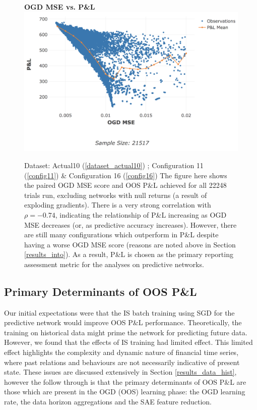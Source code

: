 \documentclass[a4paper,11pt,oneside]{article}
\theoremstyle{plain}
\theoremstyle{definition}
\begin{document}
		\begin{figure}[H]
		\textbf{OGD MSE vs. P\&L}
		\centering
		\includegraphics[scale=0.45]{images/results/intro/ogdmse_pl.png}
		\caption[OGD MSE vs. OOS P\&L]
		{Dataset: Actual10 (\ref{dataset_actual10}) ; Configuration 11 (\ref{config11}) \&  Configuration 16 (\ref{config16}) \newline 
			The figure here shows the paired OGD MSE score and OOS P\&L achieved for all 22248 trials run, excluding networks with null returns (a result of exploding gradients). There is a very strong correlation with $\rho = -0.74$, indicating the relationship of P\&L increasing as OGD MSE decreases (or, as predictive accuracy increases). However, there are still many configurations which outperform in P\&L despite having a worse OGD MSE score (reasons are noted above in Section \ref{results_into}). As a result, P\&L is chosen as the primary reporting assessment metric for the analyses on predictive networks. }
		\label{figure-ogdmse_pl}
	\end{figure}
	
	\newpage
	\subsection{Primary Determinants of OOS P\&L}\label{results_oos_pl}
	
	Our initial expectations were that the IS batch training using SGD for the predictive network would improve OOS P\&L performance. Theoretically, the training on historical data might prime the network for predicting future data. However, we found that the effects of IS training had limited effect. This limited effect highlights the complexity and dynamic nature of financial time series, where past relations and behaviours are not necessarily indicative of present state. These issues are discussed extensively in Section \ref{results_data_hist}, however the follow through is that the primary determinants of OOS P\&L are those which are present in the OGD (OOS) learning phase: the OGD learning rate, the data horizon aggregations and the SAE feature reduction.\newline
	
\end{document}
